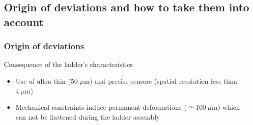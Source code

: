 \documentclass{beamer}
\begin{document}
  \subsection{Origin of deviations and how to take them into account}
  \begin{frame}
    \frametitle{Origin of deviations}

    \vspace{-0.2cm}
    \begin{block}{Consequence of the ladder's characteristics}
      \begin{itemize}
        \item Use of ultra-thin (50 $\mu\text{m}$) and precise sensors (spatial resolution less than $4~\mu\text{m}$)
        \item Mechanical constraints induce permanent deformations ($\simeq 100~\mu\text{m}$) which can not be flattened during the ladder assembly
      \end{itemize}
    \end{block}




  \end{frame}
\end{document}
